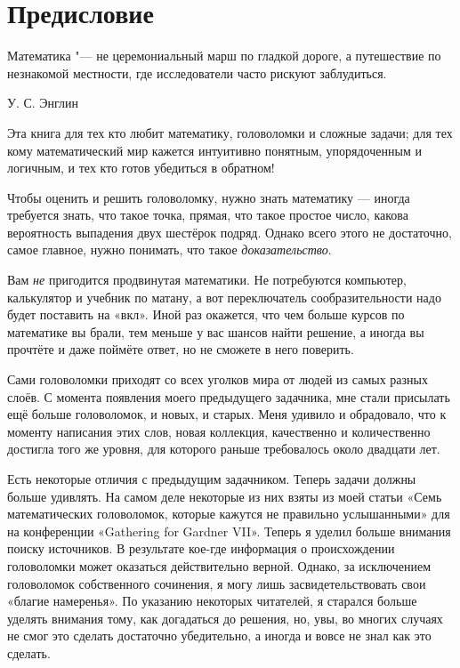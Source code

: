 \chapter{Предисловие}

\setlength{\epigraphwidth}{.6\textwidth}
\epigraph{Математика "--- не церемониальный марш по гладкой дороге, а путешествие по незнакомой местности, где исследователи часто рискуют заблудиться.
}{У. С. Энглин
}

Эта книга для тех кто любит математику, головоломки и сложные задачи;
для тех кому математический мир кажется интуитивно понятным, упорядоченным и логичным, и тех кто готов убедиться в обратном!

Чтобы оценить и решить головоломку, нужно знать математику --- 
иногда требуется знать, что такое точка, прямая, что такое простое число, какова вероятность выпадения двух шестёрок подряд. Однако всего этого не достаточно, самое главное, нужно понимать, что такое \emph{доказательство}.

Вам \emph{не} пригодится продвинутая математики.
Не потребуются компьютер, калькулятор и учебник по матану,
а вот переключатель сообразительности надо будет поставить на «вкл».
Иной раз окажется, что чем больше курсов по математике вы брали, тем меньше у вас шансов найти решение,
а иногда вы прочтёте и даже поймёте ответ, но не сможете в него поверить.

Сами головоломки приходят со всех уголков мира от людей из самых разных слоёв.
С момента появления моего предыдущего задачника, мне стали присылать ещё больше головоломок, и новых, и старых.
Меня удивило и обрадовало, что к моменту написания этих слов, новая коллекция, качественно и количественно достигла того же уровня, для которого раньше требовалось около двадцати лет.

Есть некоторые отличия с предыдущим задачником.
Теперь задачи должны больше удивлять.
На самом деле некоторые из них взяты из моей статьи «Семь математических головоломок, которые кажутся не правильно услышанными» \cite{winkler-7} для на конференции «Gathering for Gard\-ner VII».
Теперь я уделил больше внимания поиску источников.
В результате кое-где информация о происхождении головоломки может оказаться действительно верной.
Однако, за исключением головоломок собственного сочинения, я могу лишь засвидетельствовать свои «благие намеренья».
По указанию некоторых читателей, я старался больше уделять внимания тому, как догадаться до решения,
но, увы, во многих случаях не смог это сделать достаточно убедительно, а иногда и вовсе не знал как это сделать.

